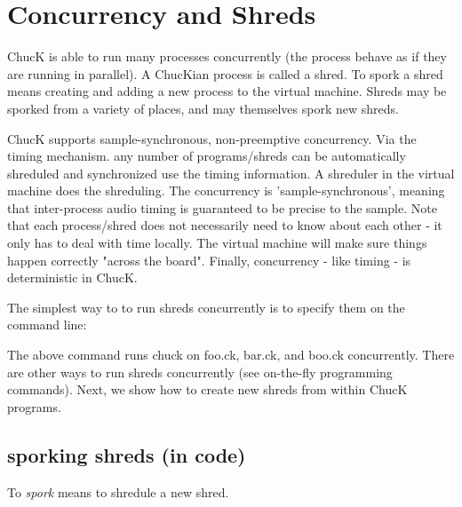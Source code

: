 \chapter{Concurrency and Shreds}

ChucK is able to run many processes concurrently (the process behave as if they are running in parallel). A ChucKian process is called a shred. To spork a shred means creating and adding a new process to the virtual machine. Shreds may be sporked from a variety of places, and may themselves spork new shreds.

ChucK supports sample-synchronous, non-preemptive concurrency. Via the timing mechanism. any number of programs/shreds can be automatically shreduled and synchronized use the timing information. A shreduler in the virtual machine does the shreduling. The concurrency is 'sample-synchronous', meaning that inter-process audio timing is guaranteed to be precise to the sample. Note that each process/shred does not necessarily need to know about each other - it only has to deal with time locally. The virtual machine will make sure things happen correctly "across the board". Finally, concurrency - like timing - is deterministic in ChucK.

The simplest way to to run shreds concurrently is to specify them on the command line:


The above command runs chuck on foo.ck, bar.ck, and boo.ck concurrently. There are other ways to run shreds concurrently (see on-the-fly programming commands). Next, we show how to create new shreds from within ChucK programs.

\section{sporking shreds (in code)}

To {\it spork} means to shredule a new shred.

